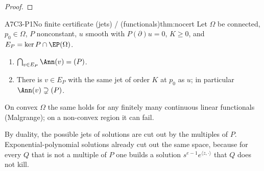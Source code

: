 \begin{proof}
\end{proof}

\begin{dimcard}{A7}{C3-P1}{No finite certificate}{\proved{} (jets) / \cf{} (functionals)}{thm:nocert}
Let $\Omega$ be connected, $p_0\in\Omega$, $P$ nonconstant, $u$ smooth with $P(\partial)u=0$, $K\ge0$, and $E_P=\ker P\cap\EP(\Omega)$.
\begin{enumerate}[label=(\roman*)]
\item $\bigcap_{v\in E_P}\Ann(v)=(P)$.
\item There is $v\in E_P$ with the same jet of order $K$ at $p_0$ as $u$; in particular $\Ann(v)\supsetneq(P)$.
\end{enumerate}
On convex $\Omega$ the same holds for any finitely many continuous linear functionals (Malgrange); on a non-convex region it can fail.
\end{dimcard}

\begin{proofidea}
By duality, the possible jets of solutions are cut out by the multiples of $P$. Exponential-polynomial solutions already cut out the same space, because for every $Q$ that is not a multiple of $P$ one builds a solution $s^{e-1}e^{\langle z,\cdot\rangle}$ that $Q$ does not kill.
\end{proofidea}

